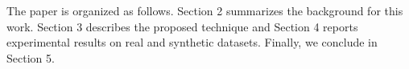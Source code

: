 \documentclass[conference]{IEEEtran}
\newcommand{ \Correction }[ 1 ] {\textcolor{black}{#1}}
\newcommand{ \NewMaterial }[ 1 ] {\textcolor{black}{#1}}
\begin{document}
  



The paper is organized as follows. Section 2 summarizes the background for this work. Section 3 describes the proposed technique and Section 4 reports experimental results on real and synthetic datasets. Finally, we conclude in Section 5.
 
\end{document}
